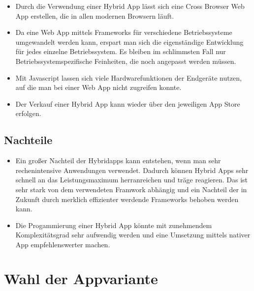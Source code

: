 \begin{itemize}

	\item Durch die Verwendung einer Hybrid App lässt sich eine Cross Browser Web App erstellen, die in allen modernen Browsern läuft.\cite[]{WEB:APPEV:2014}

	\item Da eine Web App mittels Frameworks für verschiedene Betriebssysteme umgewandelt werden kann, erspart man sich die eigenständige Entwicklung für jedes einzelne Betriebssystem. Es bleiben im schlimmsten Fall nur Betriebssystemspezifische Feinheiten, die noch angepasst werden müssen.\cite[]{WEB:APPEV:2014}

	\item Mit Javascript lassen sich viele Hardwarefunktionen der Endgeräte nutzen, auf die man bei einer Web App nicht zugreifen konnte.\cite[]{WEB:APPEV:2014}

	\item Der Verkauf einer Hybrid App kann wieder über den jeweiligen App Store erfolgen.\cite[]{WEB:APPEV:2014}

\end{itemize}

\subsection{Nachteile}
\label{sec:hybrid:cons}

\begin{itemize}

	\item Ein großer Nachteil der Hybridapps kann entstehen, wenn man sehr rechenintensive Anwendungen verwendet. Dadurch können Hybrid Apps sehr schnell an das Leistungsmaximum herranreichen und träge reagieren. Das ist sehr stark von dem verwendeten Framwork abhängig und ein Nachteil der in Zukunft durch merklich effizienter werdende Frameworks behoben werden kann.\cite[]{WEB:APPEV:2014}

	\item Die Progammierung einer Hybrid App könnte mit zunehmendem Komplexitätsgrad sehr aufwendig werden und eine Umsetzung mittels nativer App empfehlenswerter machen.\cite[]{WEB:APPEV:2014}

\end{itemize}

\section{Wahl der Appvariante}
\label{sec:intro:Appvariante}

